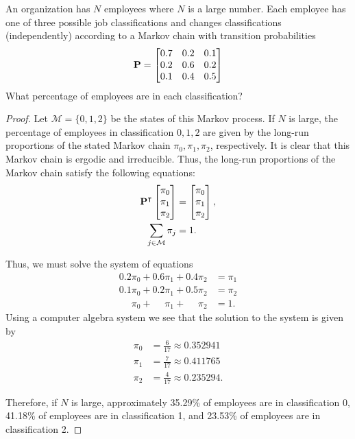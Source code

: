 \begin{problem}{4.29}
  An organization has $N$ employees where $N$ is a large number. Each employee
  has one of three possible job classifications and changes classifications (independently)
  according to a Markov chain with transition probabilities
  \begin{align*}
    \bold{P} =
    \begin{bmatrix}
      0.7 & 0.2 & 0.1 \\
      0.2 & 0.6 & 0.2 \\
      0.1 & 0.4 & 0.5
    \end{bmatrix}
  \end{align*}
  What percentage of employees are in each classification?
\end{problem}

\begin{proof}
  Let $\mathcal{M} = \{0,1,2\}$ be the states of this Markov process.
  If $N$ is large, the percentage of employees in classification $0, 1, 2$ are given by the long-run
  proportions of the stated Markov chain $\pi_0, \pi_1, \pi_2$, respectively.
  It is clear that this Markov chain is ergodic and irreducible. Thus, the long-run
  proportions of the Markov chain satisfy the following equations:
  \begin{align*}
     \bold{P}^\intercal \begin{bmatrix} \pi_0 \\ \pi_1 \\ \pi_2 \\ \end{bmatrix} &= \begin{bmatrix} \pi_0 \\ \pi_1 \\ \pi_2 \\\end{bmatrix},\\
     \sum_{j\in \mathcal{M}} \pi_j &= 1.
  \end{align*}

  Thus, we must solve the system of equations
  \begin{align*}
    0.2 \pi_0 + 0.6 \pi_1 + 0.4 \pi_2 &= \pi_1 \\
    0.1 \pi_0 + 0.2 \pi_1 + 0.5 \pi_2 &= \pi_2 \\
    \phantom{0.1} \pi_0 + \phantom{0.1}\pi_1 + \phantom{0.1} \pi_2 &= 1.
  \end{align*}
  Using a computer algebra system we see that the solution to the system is given
  by
  \begin{align*}
    \pi_0 &= \frac{6}{17} \approx 0.352941 \\
    \pi_1 &= \frac{7}{17} \approx 0.411765 \\
    \pi_2 &= \frac{4}{17} \approx 0.235294.
  \end{align*}

  Therefore, if $N$ is large, approximately 35.29\% of employees are in classification 0,
  41.18\% of employees are in classification 1, and 23.53\% of employees are in classification 2.
\end{proof}
\newpage
